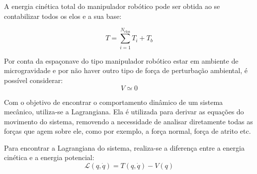 A energia cinética total do manipulador robótico pode ser obtida ao se contabilizar todos os elos e a sua base:

\begin{equation}
T = \sum_{i=1}^{N_{\text{elos}}} T_i + T_b
\end{equation}

Por conta da espaçonave do tipo manipulador robótico estar em ambiente de microgravidade e por não haver outro tipo de força de perturbação ambiental, é possível considerar:
\begin{equation}
V \simeq 0
\end{equation}

Com o objetivo de encontrar o comportamento dinâmico de um sistema mecânico, utiliza-se a Lagrangiana. Ela é utilizada para derivar as equações do movimento do sistema, removendo a necessidade de analisar diretamente todas as forças que agem sobre ele, como por exemplo, a força normal, força de atrito etc.

Para encontrar a Lagrangiana do sistema, realiza-se a diferença entre a energia cinética e a energia potencial:
\begin{equation}
\mathcal{L}(q, \dot{q}) = T(q, \dot{q}) - V(q)
\end{equation}



